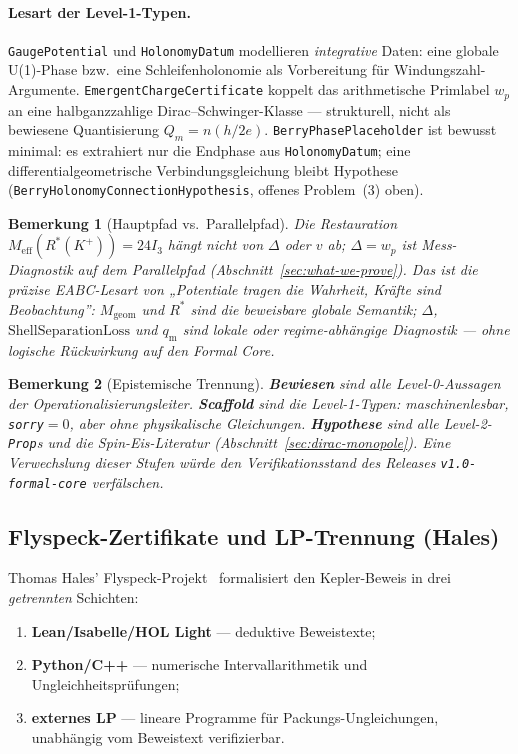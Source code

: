 \documentclass[11pt,a4paper]{article}
\newtheorem{remark}{Bemerkung}
\begin{document}
	\paragraph{Lesart der Level-1-Typen.}
	\texttt{GaugePotential} und \texttt{HolonomyDatum} modellieren
	\emph{integrative} Daten: eine globale U(1)-Phase bzw.\ eine Schleifenholonomie
	als Vorbereitung für Windungszahl-Argumente.
	\texttt{EmergentChargeCertificate} koppelt das arithmetische Primlabel $w_p$
	an eine halbganzzahlige Dirac--Schwinger-Klasse --- strukturell, nicht als
	bewiesene Quantisierung $Q_m=n(h/2e)$.
	\texttt{BerryPhasePlaceholder} ist bewusst minimal: es extrahiert nur die
	Endphase aus \texttt{HolonomyDatum}; eine differentialgeometrische
	Verbindungsgleichung bleibt Hypothese
	(\texttt{BerryHolonomyConnectionHypothesis}, offenes Problem~(3) oben).
	
	\begin{remark}[Hauptpfad vs.\ Parallelpfad]
		Die Restauration $M_{\mathrm{eff}}(R^*(K^+))=24I_3$ hängt \emph{nicht} von
		$\Delta$ oder $v$ ab; $\Delta=w_p$ ist Mess-Diagnostik auf dem Parallelpfad
		(Abschnitt~\ref{sec:what-we-prove}).
		Das ist die präzise EABC-Lesart von „Potentiale tragen die Wahrheit,
		Kräfte sind Beobachtung'':
		$M_{\mathrm{geom}}$ und $R^*$ sind die beweisbare globale Semantik;
		$\Delta$, $\mathrm{ShellSeparationLoss}$ und $q_{\mathrm m}$ sind lokale
		oder regime-abhängige Diagnostik --- ohne logische Rückwirkung auf den
		Formal Core.
	\end{remark}
	
	\begin{remark}[Epistemische Trennung]
		\textbf{Bewiesen} sind alle Level-0-Aussagen der Operationalisierungsleiter.
		\textbf{Scaffold} sind die Level-1-Typen: maschinenlesbar, \texttt{sorry}$=0$,
		aber ohne physikalische Gleichungen.
		\textbf{Hypothese} sind alle Level-2-\texttt{Prop}s und die Spin-Eis-Literatur
		(Abschnitt~\ref{sec:dirac-monopole}).
		Eine Verwechslung dieser Stufen würde den Verifikationsstand des Releases
		\texttt{v1.0-formal-core} verfälschen.
	\end{remark}
	
	\subsection{Flyspeck-Zertifikate und LP-Trennung (Hales)}
	\label{sec:flyspeck-certificates}
	
	Thomas Hales' Flyspeck-Projekt~\cite{flyspeck} formalisiert den
	Kepler-Beweis in drei \emph{getrennten} Schichten:
	\begin{enumerate}
		\item \textbf{Lean/Isabelle/HOL Light} --- deduktive Beweistexte;
		\item \textbf{Python/C++} --- numerische Intervallarithmetik und Ungleichheitsprüfungen;
		\item \textbf{externes LP} --- lineare Programme für Packungs-Ungleichungen,
		unabhängig vom Beweistext verifizierbar.
	\end{enumerate}
	
\end{document}
